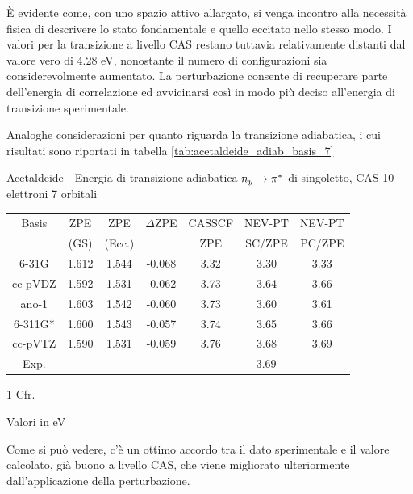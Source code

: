 \`E evidente come, con uno spazio attivo allargato, si venga incontro alla
necessit\`a fisica di descrivere lo stato fondamentale e quello eccitato
nello stesso modo. I valori per la transizione a livello CAS restano
tuttavia relativamente distanti dal valore vero di 4.28 eV, nonostante il
numero di configurazioni sia considerevolmente aumentato. La perturbazione
consente di recuperare parte dell'energia di correlazione ed avvicinarsi
cos\`i in modo pi\`u deciso all'energia di transizione sperimentale.

Analoghe considerazioni per quanto riguarda la transizione adiabatica,
i cui risultati sono riportati in tabella \ref{tab:acetaldeide_adiab_basis_7}

\begin{center}
\begin{threeparttable}
\caption{\small Acetaldeide - Energia di transizione adiabatica $n_y \rightarrow \pi^{*}$ di singoletto, CAS 10 elettroni 7 orbitali}
\label{tab:acetaldeide_adiab_basis_7}
\small
\begin{tabular}{|c|ccc|ccc|}
\hline
Basis	& ZPE 			& ZPE 			& $\Delta$ZPE		& CASSCF		& NEV-PT		& NEV-PT	 \\
		& (GS)			& (Ecc.) 		& 					& ZPE			& SC/ZPE		& PC/ZPE 	 \\
\hline
6-31G	& 1.612			& 1.544			& -0.068			& 3.32			& 3.30			& 3.33			 \\
cc-pVDZ & 1.592			& 1.531			& -0.062			& 3.73 			& 3.64			& 3.66			 \\
ano-1	& 1.603			& 1.542			& -0.060			& 3.73			& 3.60 			& 3.61			 \\
6-311G* & 1.600 		& 1.543			& -0.057			& 3.74			& 3.65			& 3.66			 \\
cc-pVTZ & 1.590			& 1.531			& -0.059			& 3.76			& 3.68			& 3.69			 \\
\hline
\hline
Exp.\tnote{1}&				& 				& 					& \multicolumn{3}{c|}{3.69} \\
\hline
\end{tabular}
\begin{tablenotes}
 \item[1] Cfr. \cite{jpc-97-17-1993-4293}
 \item[] Valori in eV
\end{tablenotes}
\end{threeparttable}
\end{center}

Come si pu\`o vedere, c'\`e un ottimo accordo tra il dato sperimentale e il
valore calcolato, gi\`a buono a livello CAS, che viene migliorato ulteriormente
dall'applicazione della perturbazione.

